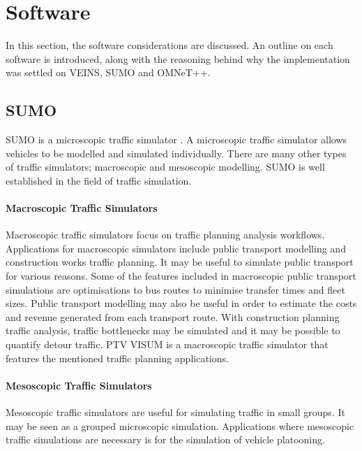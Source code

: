 \section{Software}
In this section, the software considerations are discussed. An outline on each software is introduced, along with the reasoning behind why the implementation was settled on VEINS, SUMO and OMNeT++.

\subsection{SUMO}\label{ssec:SUMO_SOFTWARE}
SUMO is a microscopic traffic simulator \citep{SUMO2012}. A microscopic traffic simulator allows vehicles to be modelled and simulated individually. There are many other types of traffic simulators; macroscopic and mesoscopic modelling. SUMO is well established in the field of traffic simulation. 

\paragraph{Macroscopic Traffic Simulators}
Macroscopic traffic simulators focus on traffic planning analysis workflows. Applications for macroscopic simulators include public transport modelling and construction works traffic planning. It may be useful to simulate public transport for various reasons. Some of the features included in macroscopic public transport simulations are optimisations to bus routes to minimise transfer times and fleet sizes. Public transport modelling may also be useful in order to estimate the costs and revenue generated from each transport route. With construction planning traffic analysis, traffic bottlenecks may be simulated and it may be possible to quantify detour traffic. PTV VISUM is a macroscopic traffic simulator that features the mentioned traffic planning applications.

\paragraph{Mesoscopic Traffic Simulators}
Mesoscopic traffic simulators are useful for simulating traffic in small groups. It may be seen as a grouped microscopic simulation. Applications where mesoscopic traffic simulations are necessary is for the simulation of vehicle platooning.

